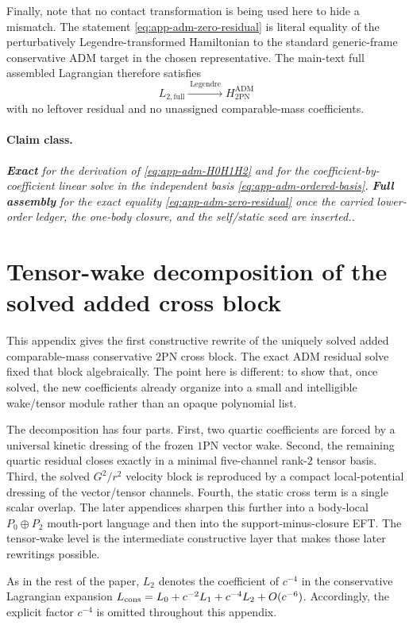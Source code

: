 \documentclass[11pt]{article}
\newcommand{\OnePN}{\mathrm{1PN}}
\newcommand{\TwoPN}{\mathrm{2PN}}
\newcommand{\ADM}{\mathrm{ADM}}
\newcommand{\Exact}{\textbf{Exact}}
\newcommand{\FullMatch}{\textbf{Full assembly}}
\newcommand{\claimclass}[1]{\paragraph{Claim class.}\emph{#1.}}
\begin{document}
Finally, note that no contact transformation is being used here to hide a mismatch.
The statement \cref{eq:app-adm-zero-residual} is literal equality of the perturbatively
Legendre-transformed Hamiltonian to the standard generic-frame conservative
\(\ADM\) target in the chosen representative.  The main-text full assembled Lagrangian
therefore satisfies
\begin{equation}
L_{2,\mathrm{full}}
\xrightarrow{\ \text{Legendre}\ }
H_{2\mathrm{PN}}^{\ADM}
\label{eq:app-adm-final-arrow}
\end{equation}
with no leftover residual and no unassigned comparable-mass coefficients.

\claimclass{\Exact{} for the derivation of
\cref{eq:app-adm-H0H1H2} and for the coefficient-by-coefficient linear solve in the
independent basis \cref{eq:app-adm-ordered-basis}.  \FullMatch{} for the exact equality
\cref{eq:app-adm-zero-residual} once the carried lower-order ledger, the one-body
closure, and the self/static seed are inserted.}

\section{Tensor-wake decomposition of the solved added cross block}
\label{app:tensor-wake}

This appendix gives the first constructive rewrite of the uniquely solved added
comparable-mass conservative \(\TwoPN\) cross block.
The exact \(\ADM\) residual solve fixed that block algebraically.
The point here is different: to show that, once solved, the new coefficients already
organize into a small and intelligible wake/tensor module rather than an opaque
polynomial list.

The decomposition has four parts.
First, two quartic coefficients are forced by a universal kinetic dressing of the frozen
\(\OnePN\) vector wake.
Second, the remaining quartic residual closes exactly in a minimal five-channel rank-\(2\)
tensor basis.
Third, the solved \(G^2/r^2\) velocity block is reproduced by a compact local-potential
dressing of the vector/tensor channels.
Fourth, the static cross term is a single scalar overlap.
The later appendices sharpen this further into a body-local
\(P_0\oplus P_2\) mouth-port language and then into the support-minus-closure EFT.
The tensor-wake level is the intermediate constructive layer that makes those later
rewritings possible.

As in the rest of the paper, \(L_2\) denotes the coefficient of \(c^{-4}\) in the
conservative Lagrangian expansion
\(L_{\rm cons}=L_0+c^{-2}L_1+c^{-4}L_2+O(c^{-6})\).
Accordingly, the explicit factor \(c^{-4}\) is omitted throughout this appendix.
\end{document}
